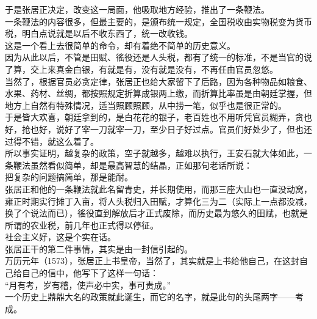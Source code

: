 \begin{multicols}{\theparacolNo}
于是张居正决定，改变这一局面，他吸取地方经验，推出了一条鞭法。\\

一条鞭法的内容很多，但最主要的，是颁布统一规定，全国税收由实物税变为货币税，明白点说就是以后不收东西了，统一改收钱。\\

这是一个看上去很简单的命令，却有着绝不简单的历史意义。\\

因为从此以后，不管是田赋、徭役还是人头税，都有了统一的标准，不是当官的说了算，交上来真金白银，有就是有，没有就是没有，不再任由官员忽悠。\\

当然了，根据官员必贪定律，张居正也给大家留下了后路，因为各种物品如粮食、水果、药材、丝绸，都按照规定折算成银两上缴，而折算比率虽是由朝廷掌握，但地方上自然有特殊情况，适当照顾照顾，从中捞一笔，似乎也是很正常的。\\

于是皆大欢喜，朝廷拿到的，是白花花的银子，老百姓也不用听凭官员糊弄，贪也好，抢也好，说好了宰一刀就宰一刀，至少日子好过点。官员们好处少了，但也还过得不错，就这么着了。\\

所以事实证明，越复杂的政策，空子就越多，越难以执行，王安石就大体如此，一条鞭法虽然看似简单，却是最高智慧的结晶，正如那句老话所说：\\

把复杂的问题搞简单，那是能耐。\\

张居正和他的一条鞭法就此名留青史，并长期使用，而那三座大山也一直没动窝，雍正时期实行摊丁入亩，将人头税归入田赋，才算化三为二（实际上一点都没减，换了个说法而已），徭役直到解放后才正式废除，而历史最为悠久的田赋，也就是所谓的农业税，前几年也正式得以停征。\\

社会主义好，这是个实在话。\\

张居正干的第二件事情，其实是由一封信引起的。\\

万历元年（1573），张居正上书皇帝，当然了，其实就是上书给他自己，在这封自己给自己的信中，他写下了这样一句话：\\

“月有考，岁有稽，使声必中实，事可责成。”\\

一个历史上鼎鼎大名的政策就此诞生，而它的名字，就是此句的头尾两字——考成。\\


\end{multicols}
